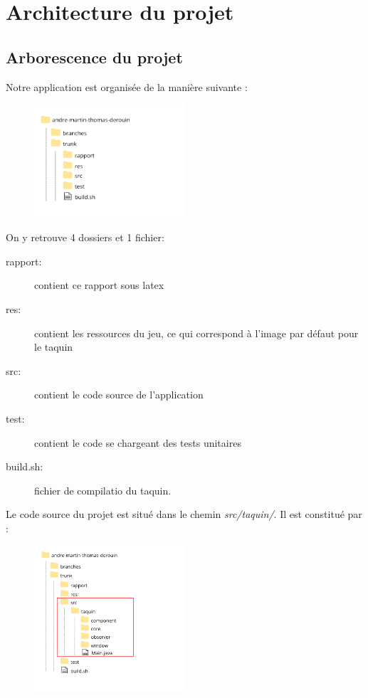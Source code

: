\chapter{Architecture du projet}

	\section{Arborescence du projet}

		Notre application est organisée de la manière suivante :


		\begin{figure}[H]
			\centering
			\includegraphics[width=0.5\textwidth, keepaspectratio]{img/racine.png}
		\end{figure}

		On y retrouve 4 dossiers et 1 fichier:

		\begin{description}
			\item [rapport:] contient ce rapport sous latex
			\item [res:] contient les ressources du jeu, ce qui correspond à l’image par défaut pour le taquin
			\item [src:] contient le code source de l’application
			\item [test:] contient le code se chargeant des tests unitaires
			\item [build.sh:] fichier de compilatio du taquin.
		\end{description}

		Le code source du projet est situé dans le chemin \textit{src/taquin/}. Il est constitué par :

		\begin{figure}[H]
			\centering
			\includegraphics[width=0.5\textwidth, keepaspectratio]{img/detail.png}
		\end{figure}

